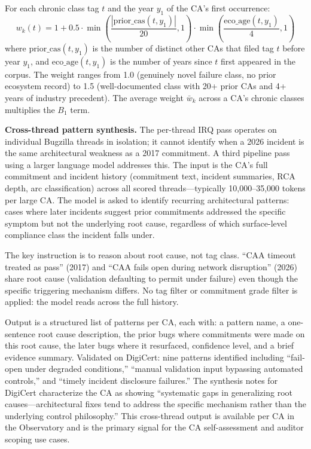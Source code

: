 \documentclass[10pt,twocolumn,letterpaper]{article}
\begin{document}
For each chronic class tag $t$ and the year $y_1$ of the CA's first occurrence:
\[
w_k(t) = 1 + 0.5 \cdot \min\!\left(\frac{|\text{prior\_cas}(t, y_1)|}{20}, 1\right)
              \cdot \min\!\left(\frac{\text{eco\_age}(t, y_1)}{4}, 1\right)
\]
where $\text{prior\_cas}(t, y_1)$ is the number of distinct other CAs that filed tag
$t$ before year $y_1$, and $\text{eco\_age}(t, y_1)$ is the number of years since $t$
first appeared in the corpus. The weight ranges from 1.0 (genuinely novel failure class,
no prior ecosystem record) to 1.5 (well-documented class with 20+ prior CAs and 4+
years of industry precedent). The average weight $\bar{w}_k$ across a CA's chronic
classes multiplies the $B_1$ term.

\textbf{Cross-thread pattern synthesis.} The per-thread IRQ pass operates
on individual Bugzilla threads in isolation; it cannot identify when a 2026 incident
is the same architectural weakness as a 2017 commitment. A third pipeline pass using
a larger language model addresses this. The input is the CA's full commitment and
incident history (commitment text, incident summaries, RCA depth, arc classification)
across all scored threads---typically 10,000--35,000 tokens per large CA. The model
is asked to identify recurring architectural patterns: cases where later incidents
suggest prior commitments addressed the specific symptom but not the underlying root
cause, regardless of which surface-level compliance class the incident falls under.

The key instruction is to reason about root cause, not tag class. ``CAA timeout treated
as pass'' (2017) and ``CAA fails open during network disruption'' (2026) share root
cause (validation defaulting to permit under failure) even though the specific
triggering mechanism differs. No tag filter or commitment grade filter is applied:
the model reads across the full history.

Output is a structured list of patterns per CA, each with: a pattern name, a one-sentence
root cause description, the prior bugs where commitments were made on this root cause,
the later bugs where it resurfaced, confidence level, and a brief evidence summary.
Validated on DigiCert: nine patterns identified including ``fail-open under degraded
conditions,'' ``manual validation input bypassing automated controls,'' and ``timely
incident disclosure failures.'' The synthesis notes for DigiCert characterize the
CA as showing ``systematic gaps in generalizing root causes---architectural fixes
tend to address the specific mechanism rather than the underlying control philosophy.''
This cross-thread output is available per CA in the Observatory and is the primary
signal for the CA self-assessment and auditor scoping use cases.
\end{document}

